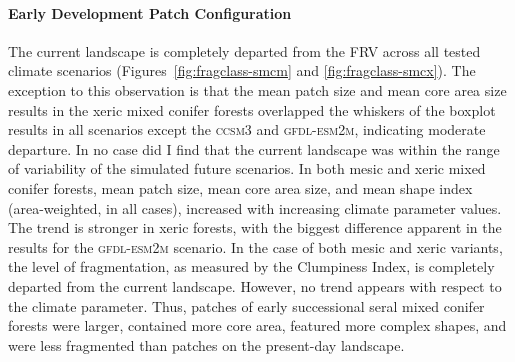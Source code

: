 \paragraph*{Early Development Patch Configuration}
The current landscape is completely departed from the FRV across all tested climate scenarios (Figures~\ref{fig:fragclass-smcm} and \ref{fig:fragclass-smcx}). The exception to this observation is that the mean patch size and mean core area size results in the xeric mixed conifer forests overlapped the whiskers of the boxplot results in all scenarios except the \textsc{ccsm3} and \textsc{gfdl-esm2m}, indicating moderate departure. In no case did I find that the current landscape was within the range of variability of the simulated future scenarios. In both mesic and xeric mixed conifer forests, mean patch size, mean core area size, and mean shape index (area-weighted, in all cases), increased with increasing climate parameter values. The trend is stronger in xeric forests, with the biggest difference apparent in the results for the \textsc{gfdl-esm2m} scenario. In the case of both mesic and xeric variants, the level of fragmentation, as measured by the Clumpiness Index, is completely departed from the current landscape. However, no trend appears with respect to the climate parameter. Thus, patches of early successional seral mixed conifer forests were larger, contained more core area, featured more complex shapes, and were less fragmented than patches on the present-day landscape.


